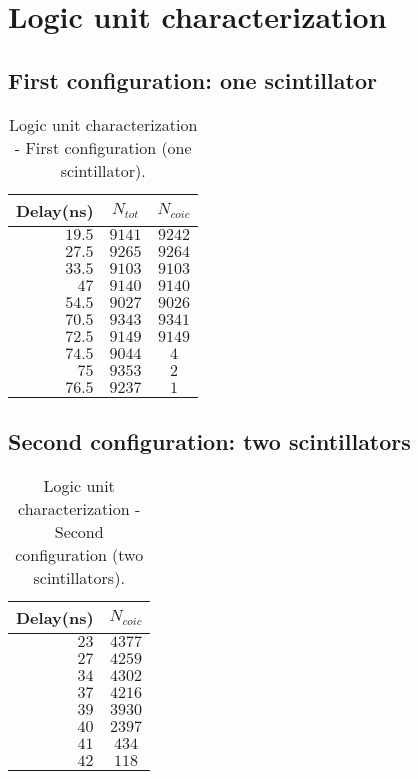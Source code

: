 \newpage

\section{Logic unit characterization}
\label{app:Logic Unit}
\subsection{First configuration: one scintillator}

\begin{table}[!htp]
	\centering
	\begin{tabular}{r|cc}
		\toprule
		Delay(ns)&$N_{tot}$&$N_{coic}$\\
		\midrule
		$19.5$  & $ 9141$  &  $9242$ \\
		$27.5$  &  $9265$ &   $9264$\\
		$33.5$  &  $9103 $ &  $9103$\\
		$47 $  &   $9140 $  & $9140$\\
		$54.5$  & $9027$  &  $9026$\\
		$70.5 $ &  $9343 $  & $9341$\\
		$72.5$ &  $9149$ &   $9149$\\
		$74.5$ &  $9044 $ &  $4$\\
		$75$    &  $9353$ &   $2$\\
		$76.5$   &$ 9237 $ & $ 1$\\
		\bottomrule	
	\end{tabular}
	\caption{Logic unit characterization - First configuration (one scintillator).}\label{tab:Logic Unit first conf}
\end{table}

\subsection{Second configuration: two scintillators}
\begin{table}[!htp]
	\centering
	\begin{tabular}{r|c}
		\toprule
		Delay(ns)&$N_{coic}$\\
		\midrule
		$23 $     & $4377$ \\    
		$27  $ &    $4259$\\
		$34$ &     $ 4302 $ \\
		$37$  & $ 4216$\\
		$39$ &     $ 3930$\\
		$40 $ &     $2397$\\
		$41$ &     $434$\\
		$42 $ &    	$118$\\

		\bottomrule	
	\end{tabular}
	\caption{Logic unit characterization - Second configuration (two scintillators).}\label{tab:Logic Unit second conf}
\end{table}
\newpage
